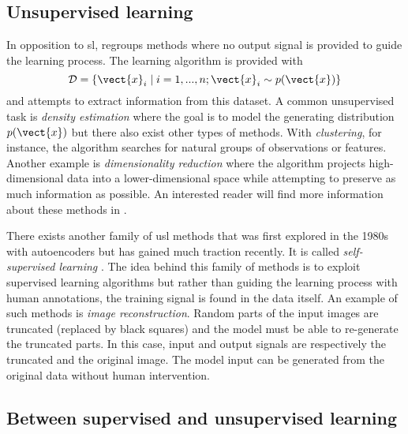 \subsection{Unsupervised learning}
\label{ssec:backml:usl}

In opposition to \acrlong{sl},  regroups methods where no output
signal is provided to guide the learning process. The learning algorithm is provided
with
\begin{equation}
\mathcal{D} = \left\{\vect{x}_i \mid i = 1,..., n ; \vect{x}_i \sim p(\vect{x})\right\}
\end{equation}
and attempts to extract information from this dataset. A common unsupervised task
is \textit{density estimation} where the goal is to model the generating distribution
$p(\vect{x})$ but there also exist other types of methods. With \textit{clustering},
for instance, the algorithm searches for natural groups of observations or features.
Another example is \textit{dimensionality reduction} where the algorithm projects
high-dimensional data into a lower-dimensional space while attempting to preserve
as much information as possible. An interested reader will find more information
about these methods in \cite{hastie2017elements}. 

There exists another family of \acrlong{usl} methods that was first 
explored in the 1980s with autoencoders \cite{ballard1987modular, le1987modeles, bourlard1988auto} 
but has gained much traction recently. It is called \textit{self-supervised learning}
\cite{lecun2021self}. The idea behind this family of methods is to exploit
supervised learning algorithms but rather than guiding the learning process with
human annotations, the training signal is found in the data itself. An example of
such methods is \textit{image reconstruction}. Random parts of the input images
are truncated (\eg replaced by black squares) and the model must be able to
re-generate the truncated parts. In this case, input and output signals are
respectively the truncated and the original image. The model input can be generated
from the original data without human intervention.

\subsection{Between supervised and unsupervised learning}
\label{ssec:backml:inbetween}

